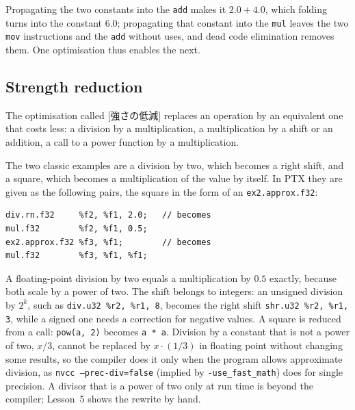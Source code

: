 \documentclass[../main.tex]{subfiles}
\begin{document}
Propagating the two constants into the \texttt{add} makes it
$2.0 + 4.0$, which folding turns into the constant $6.0$; propagating
that constant into the \texttt{mul} leaves the two \texttt{mov}
instructions and the \texttt{add} without uses, and dead code
elimination removes them.  One optimisation thus enables the
next.

\subsection{Strength reduction}

\begin{definition}
  \label{def:l11-strength}
  The optimisation called [強さの低減] replaces
  an operation by an
  equivalent one that costs less: a division by a multiplication, a
  multiplication by a shift or an addition, a call to a power function
  by a multiplication.
\end{definition}

The two classic examples are a division by two, which becomes a right
shift, and a square, which becomes a multiplication of the value by
itself.  In PTX they are given as the following pairs, the square in
the form of an \texttt{ex2.approx.f32}:
\begin{lstlisting}[language=PTX, numbers=none]
div.rn.f32     %f2, %f1, 2.0;   // becomes
mul.f32        %f2, %f1, 0.5;
ex2.approx.f32 %f3, %f1;        // becomes
mul.f32        %f3, %f1, %f1;
\end{lstlisting}
%
A floating-point division by two equals a multiplication by $0.5$
exactly, because both scale by a power of two.  The shift belongs to
integers: an unsigned division by $2^k$, such as \texttt{div.u32 \%r2,
\%r1, 8}, becomes the right shift \texttt{shr.u32 \%r2, \%r1, 3}, while
a signed one needs a correction for negative values.  A square is
reduced from a call: \texttt{pow(a, 2)} becomes \texttt{a * a}.
Division by a constant that is not a
power of two, $x/3$, cannot be replaced by $x\cdot(1/3)$ in floating
point without changing some results, so the compiler does it only when
the program allows approximate division, as \texttt{nvcc
--prec-div=false} (implied by \texttt{-use\_fast\_math}) does for
single precision.  A divisor that is a power of two only at run time is
beyond the compiler; Lesson~5 shows the rewrite by hand.
\end{document}
